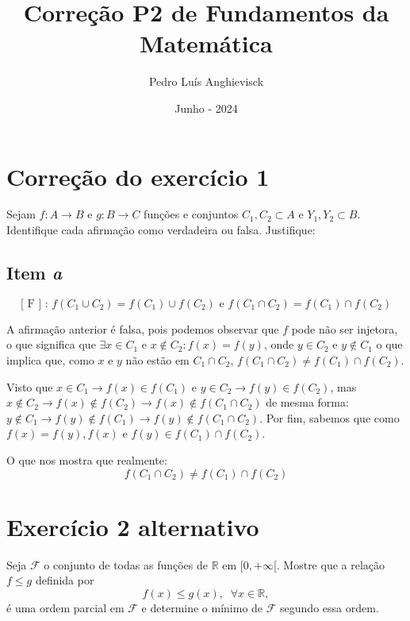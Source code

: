\documentclass{article}
\title{Correção P2 de Fundamentos da Matemática}
\author{Pedro Luís Anghievisck}
\date{Junho - 2024}
\begin{document}
    \maketitle

    \tableofcontents
    \newpage

    \section{Correção do exercício 1}
    Sejam $f:A\rightarrow B$ e $g:B\rightarrow C$ funções e 
    conjuntos $C_1, C_2 \subset A$ e $Y_1, Y_2 \subset B$. 
    Identifique cada afirmação como verdadeira ou falsa. 
    Justifique:
    \subsection*{Item \emph{a}}
    \begin{equation*}
        \text{[ F ] : } f(C_1 \cup C_2) = f(C_1) \cup f(C_2)
        \text{ e } f(C_1 \cap C_2) = f(C_1) \cap f(C_2)
    \end{equation*}

    A afirmação anterior é falsa, pois podemos observar que
    $f$ pode não ser injetora, o que significa que $\exists x
    \in C_1$ e $x \notin C_2 : f(x) = f(y)$, onde $y \in C_2$ e
    $y \notin C_1$ o que implica que, como $x$ e $y$ não estão
    em $C_1\cap C_2$, $f(C_1\cap C_2) \neq f(C_1) \cap f(C_2)$. 

    Visto que $x\in C_1 \rightarrow f(x)\in f(C_1)$ e $y\in C_2
    \rightarrow f(y) \in f(C_2)$, mas $x\notin C_2 \rightarrow
    f(x)\notin f(C_2)\rightarrow f(x)\notin f(C_1\cap C_2)$ de
    mesma forma: $y\notin C_1 \rightarrow f(y)\notin f(C_1)
    \rightarrow f(y)\notin f(C_1\cap C_2)$. Por fim,
    sabemos que como $f(x) = f(y), f(x)$ e $f(y)\in f(C_1) \cap
    f(C_2)$.
    
    O que nos mostra que realmente: 
    \begin{equation*}
        f(C_1\cap C_2)\neq f(C_1)\cap f(C_2)
    \end{equation*}

    \section{Exercício 2 alternativo}
    Seja $\mathcal{F}$ o conjunto de todas as funções de
    $\mathbb{R}$ em $[0, +\infty[$. Mostre que a relação
    $f\leq g$ definida por
    \begin{equation*}
        f(x)\leq g(x),\;\; \forall x\in\mathbb{R},
    \end{equation*}
    é uma ordem parcial em $\mathcal{F}$ e determine o mínimo
    de $\mathcal{F}$ segundo essa ordem.
\end{document}
